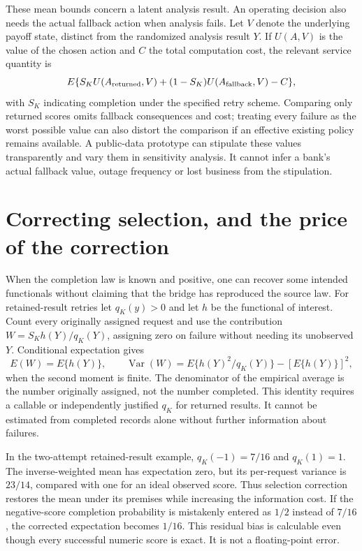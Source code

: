 These mean bounds concern a latent analysis result. An operating decision
also needs the actual fallback action when analysis fails. Let $V$ denote
the underlying payoff state, distinct from the randomized analysis result
$Y$. If $U(A,V)$ is
the value of the chosen action and $C$ the total computation cost, the
relevant service quantity is
\begin{equation}
 E\{S_K U(A_{\rm returned},V)+(1-S_K)U(A_{\rm fallback},V)-C\},
 \label{exec17:s9-service-value}
\end{equation}
with $S_K$ indicating completion under the specified retry scheme. Comparing
only returned scores omits fallback consequences and cost; treating every
failure as the worst possible value can also distort the comparison if an
effective existing policy remains available. A public-data prototype can
stipulate these values transparently and vary them in sensitivity analysis.
It cannot infer a bank's actual fallback value, outage frequency or lost
business from the stipulation.

\section{Correcting selection, and the price of the correction}
\label{exec17:s9-selection-correction}

When the completion law is known and positive, one can recover some intended
functionals without claiming that the bridge has reproduced the source law.
For retained-result retries let $q_K(y)>0$ and let $h$ be the functional of
interest. Count every originally assigned request and use the contribution
$W=S_K h(Y)/q_K(Y)$, assigning zero on failure without needing its unobserved
$Y$. Conditional expectation gives
\begin{equation}
 E(W)=E\{h(Y)\},\qquad
 \operatorname{Var}(W)=E\{h(Y)^2/q_K(Y)\}-[E\{h(Y)\}]^2,
 \label{exec17:s9-inverse-selection}
\end{equation}
when the second moment is finite. The denominator of the empirical average
is the number originally assigned, not the number completed. This identity
requires a callable or independently justified $q_K$ for returned results.
It cannot be estimated from completed records alone without further
information about failures.

In the two-attempt retained-result example, $q_K(-1)=7/16$ and $q_K(1)=1$.
The inverse-weighted mean has expectation zero, but its per-request variance
is $23/14$, compared with one for an ideal observed score. Thus selection
correction restores the mean under its premises while increasing the
information cost. If the negative-score completion probability is mistakenly
entered as $1/2$ instead of $7/16$, the corrected expectation becomes $1/16$.
This residual bias is calculable even though every successful numeric score
is exact. It is not a floating-point error.

